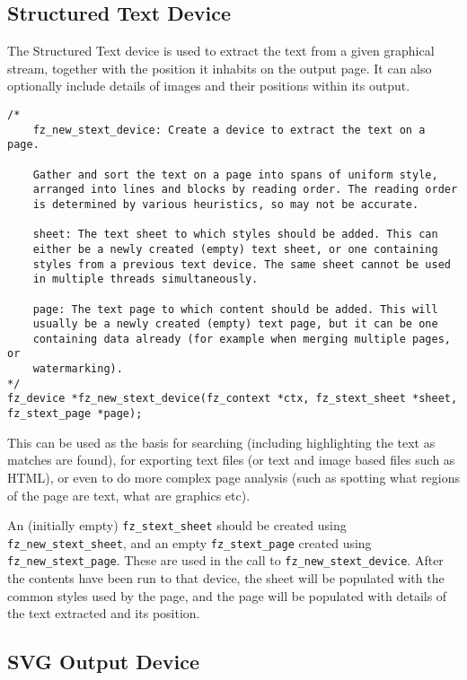 \documentclass[oneside]{book}
\begin{document}
\subsection{Structured Text Device}
\label{STextDevice}

The Structured Text device is used to extract the text from a given graphical stream, together with the position it inhabits on the output page. It can also optionally include details of images and their positions within its output.

\begin{lstlisting}
/*
	fz_new_stext_device: Create a device to extract the text on a page.

	Gather and sort the text on a page into spans of uniform style,
	arranged into lines and blocks by reading order. The reading order
	is determined by various heuristics, so may not be accurate.

	sheet: The text sheet to which styles should be added. This can
	either be a newly created (empty) text sheet, or one containing
	styles from a previous text device. The same sheet cannot be used
	in multiple threads simultaneously.

	page: The text page to which content should be added. This will
	usually be a newly created (empty) text page, but it can be one
	containing data already (for example when merging multiple pages, or
	watermarking).
*/
fz_device *fz_new_stext_device(fz_context *ctx, fz_stext_sheet *sheet, fz_stext_page *page);
\end{lstlisting}

This can be used as the basis for searching (including highlighting the text as matches are found), for exporting text files (or text and image based files such as HTML), or even to do more complex page analysis (such as spotting what regions of the page are text, what are graphics etc).

An (initially empty) \texttt{fz\_stext\_sheet} should be created using \texttt{fz\_new\_stext\_sheet}, and an empty \texttt{fz\_stext\_page} created using \texttt{fz\_new\_stext\_page}. These are used in the call to \texttt{fz\_new\_stext\_device}. After the contents have been run to that device, the sheet will be populated with the common styles used by the page, and the page will be populated with details of the text extracted and its position.



\subsection{SVG Output Device}
\label{SVGDevice}
\end{document}
